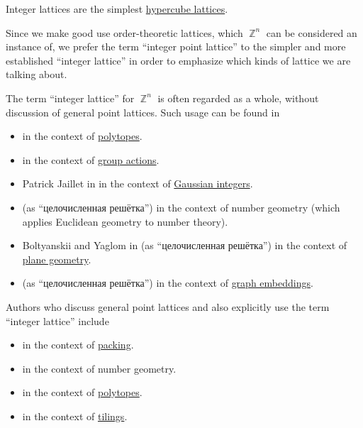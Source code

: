 \begin{comments}
  \item Integer lattices are the simplest \hyperref[def:hypercubic_point_lattice]{hypercube lattices}.

  \item Since we make good use order-theoretic lattices, which \( \BbbZ^n \) can be considered an instance of, we prefer the term \enquote{integer point lattice} to the simpler and more established \enquote{integer lattice} in order to emphasize which kinds of lattice we are talking about.

  \item The term \enquote{integer lattice} for \( \BbbZ^n \) is often regarded as a whole, without discussion of general point lattices. Such usage can be found in
  \begin{itemize}
    \item {} in the context of \hyperref[def:polytope]{polytopes}.
    \item {} in the context of \hyperref[def:group_action]{group actions}.
    \item Patrick Jaillet in \cite[503]{Rosen2018DiscreteHandbook} in the context of \hyperref[def:gaussian_integers]{Gaussian integers}.
    \item {} (as \enquote{целочисленная решётка}) in the context of number geometry (which applies Euclidean geometry to number theory).
    \item Boltyanskii and Yaglom in \cite[256]{АлександровМаркушевичХинчин1966ЭнциклопедияТом5} (as \enquote{целочисленная решётка}) in the context of \hyperref[def:euclidean_plane]{plane geometry}.
    \item {} (as \enquote{целочисленная решётка}) in the context of \hyperref[def:graph_embeddings]{graph embeddings}.
  \end{itemize}

  Authors who discuss general point lattices and also explicitly use the term \enquote{integer lattice} include
  \begin{itemize}
    \item {} in the context of \hyperref[def:topological_space_packing]{packing}.
    \item {} in the context of number geometry.
    \item {} in the context of \hyperref[def:polytope]{polytopes}.
    \item {} in the context of \hyperref[def:topological_space_tiling]{tilings}.
  \end{itemize}
\end{comments}

